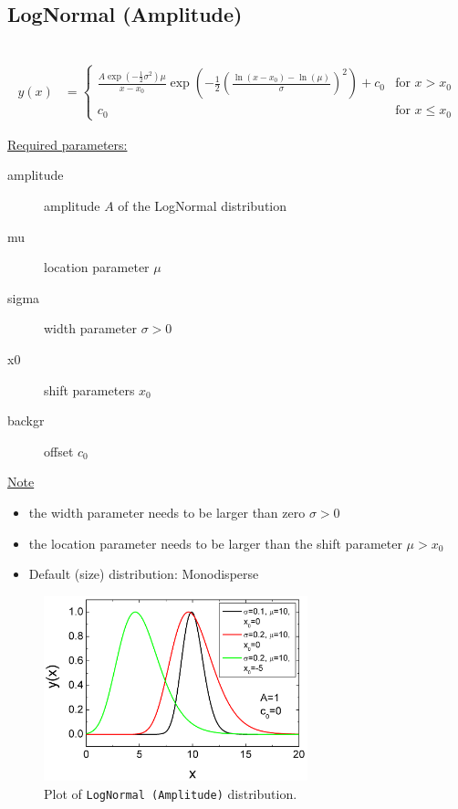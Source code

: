 \clearpage

\subsection{LogNormal (Amplitude)} ~\\
\label{sec:LogNormalAmplitude}
\begin{align}
y(x) &=
\begin{cases}
        \frac{A \exp\left(-\frac12\sigma^2\right) \mu}{x-x_0}\exp\left(-\frac{1}{2}\left(\frac{\ln (x-x_0) -
        \ln(\mu)}{\sigma}\right)^2\right) + c_0 & \mbox{for } x>x_0 \\
        c_0 & \mbox{for } x \leq x_0
\end{cases}
\end{align}

\uline{Required parameters:}
\begin{description}
    \item[amplitude] amplitude $A$ of the LogNormal distribution
    \item[mu] location parameter $\mu$
    \item[sigma] width parameter $\sigma > 0$
    \item[x0] shift parameters $x_0$
    \item[backgr] offset $c_0$
\end{description}

\uline{Note}
\begin{itemize}
  \item the width parameter needs to be larger than zero $\sigma > 0$
  \item the location parameter needs to be larger than the shift parameter $\mu > x_0$
  \item Default (size) distribution: Monodisperse
\end{itemize}

\begin{figure}[htb]
\begin{center}
\includegraphics[width=0.6824\textwidth]{LogNormalAmplitude.png}
\end{center}
\caption{Plot of \texttt{LogNormal (Amplitude)} distribution.}
\label{fig:LogNormalAmplitude}
\end{figure}

